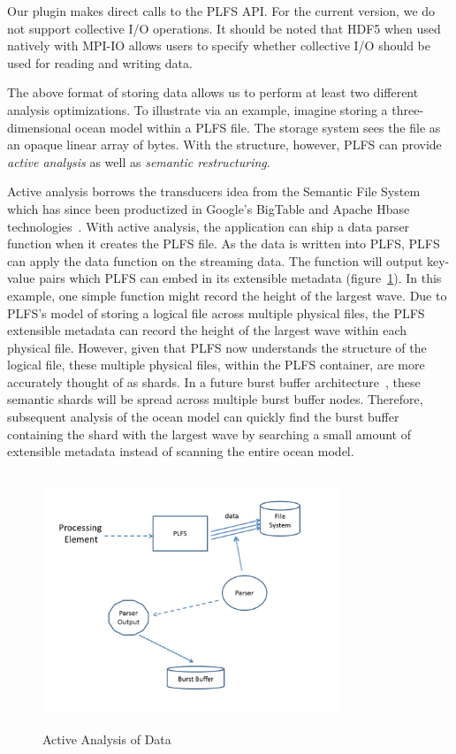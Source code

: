 Our plugin makes direct calls to the PLFS API. For the current version, we do not support collective I/O operations. It should be noted that HDF5 when used natively with MPI-IO allows users to specify whether collective I/O should be used for reading and writing data. 

The above format of storing data allows us to perform at least two different analysis optimizations.  To illustrate via an example, imagine storing a three-dimensional ocean model within a PLFS file. The storage system sees the file as an opaque linear array of bytes.  With the structure, however, PLFS can provide \textit{active analysis} as well as \textit{semantic restructuring}.  

Active analysis borrows the transducers idea from the Semantic File System~\cite{semantic_fs} which has since been productized in Google's BigTable and Apache Hbase technologies~\cite{google_coprocessors,GFS,apache_hbase}.  With active analysis, the application can ship a data parser function when it creates the PLFS file.  As the data is written into PLFS, PLFS can apply the data function on the streaming data.  The function will output key-value pairs which PLFS can embed in its extensible metadata (figure~\ref{active_analysis}).  In this example, one simple function might record the height of the largest wave.  Due to PLFS's model of storing a logical file across multiple physical files, the PLFS extensible metadata can record the height of the largest wave within each physical file.  However, given that PLFS now understands the structure of the logical file, these multiple physical files, within the PLFS container, are more accurately thought of as shards.  In a future burst buffer architecture~\cite{burst_buffers}, these semantic shards will be spread across multiple burst buffer nodes.  Therefore, subsequent analysis of the ocean model can quickly find the burst buffer containing the shard with the largest wave by searching a small amount of extensible metadata instead of scanning the entire ocean model.

\begin{figure}[!t]
\centering
\includegraphics[width=3.5in,height=3.0in]{active_analysis}
\caption{Active Analysis of Data}
\label{active_analysis}
\end{figure}

